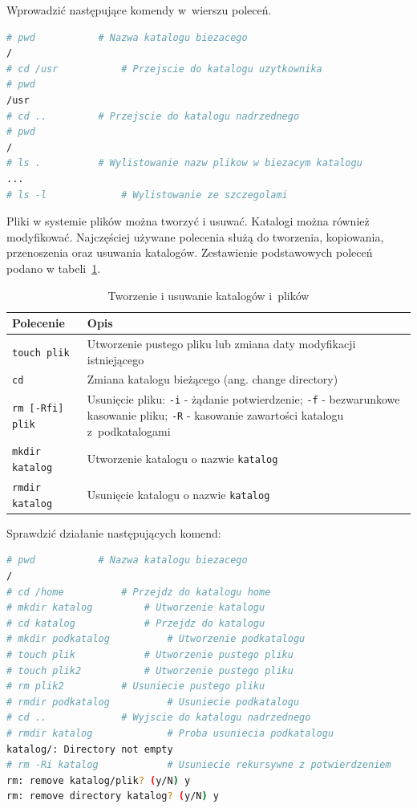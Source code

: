 \documentclass[11pt,twoside,a4paper]{article}
\begin{document}
\begin{example}
Wprowadzić następujące komendy w~wierszu poleceń. 

\begin{lstlisting}[language=bash]
# pwd			# Nazwa katalogu biezacego 
/ 
# cd /usr			# Przejscie do katalogu uzytkownika
# pwd 
/usr 
# cd ..			# Przejscie do katalogu nadrzednego 
# pwd
/
# ls .			# Wylistowanie nazw plikow w biezacym katalogu 
...
# ls -l 			# Wylistowanie ze szczegolami
\end{lstlisting}
\end{example}

\begin{example}

Pliki w systemie plików można tworzyć i usuwać. Katalogi można również modyfikować. Najczęściej używane polecenia służą do tworzenia, kopiowania, przenoszenia oraz usuwania katalogów. Zestawienie podstawowych poleceń podano w tabeli~\ref{tab:tworziusun}.

\begin{table}[h!]
\centering
\caption{Tworzenie i usuwanie katalogów i~plików}
\setlength{\arrayrulewidth}{1pt}
\setlength{\tabcolsep}{6pt}
\renewcommand{\arraystretch}{1.2}
\begin{tabular}{ |p{}|p{}|}
\hline \rowcolor{gray}
\textbf{Polecenie} & \textbf{Opis} \\ \hline
\mbox{\lstinline{touch plik}} & Utworzenie pustego pliku lub zmiana daty modyfikacji istniejącego \\ \hline 
\mbox{\lstinline{cd}}  & Zmiana katalogu bieżącego (ang. change directory) \\ \hline
\mbox{\lstinline{rm [-Rfi] plik}} & Usunięcie pliku: \mbox{\lstinline{-i}} - żądanie potwierdzenie; \mbox{\lstinline{-f}} - bezwarunkowe kasowanie pliku; \mbox{\lstinline{-R}} - kasowanie zawartości katalogu z~podkatalogami  \\ \hline 
\mbox{\lstinline{mkdir katalog}} & Utworzenie katalogu o nazwie \mbox{\lstinline{katalog}} \\ \hline 
\mbox{\lstinline{rmdir katalog}} &	Usunięcie katalogu o nazwie \mbox{\lstinline{katalog}}  \\ \hline 
\end{tabular}
\label{tab:tworziusun}
\end{table}

Sprawdzić działanie następujących komend: 

\begin{lstlisting}[language=bash]
# pwd			# Nazwa katalogu biezacego 
/
# cd /home			# Przejdz do katalogu home
# mkdir katalog			# Utworzenie katalogu
# cd katalog			# Przejdz do katalogu
# mkdir podkatalog			# Utworzenie podkatalogu
# touch plik			# Utworzenie pustego pliku
# touch plik2			# Utworzenie pustego pliku
# rm plik2			# Usuniecie pustego pliku
# rmdir podkatalog			# Usuniecie podkatalogu
# cd .. 			# Wyjscie do katalogu nadrzednego 
# rmdir katalog 			# Proba usuniecia podkatalogu
katalog/: Directory not empty 
# rm -Ri katalog			# Usuniecie rekursywne z potwierdzeniem
rm: remove katalog/plik? (y/N) y
rm: remove directory katalog? (y/N) y
\end{lstlisting}


\end{example}
\end{document}
